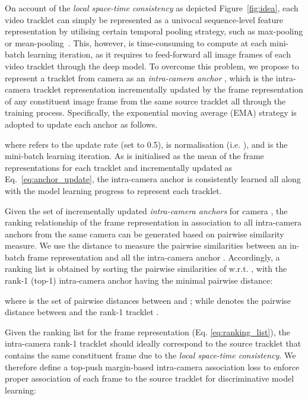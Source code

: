 \documentclass{bmvc2k}
\begin{document}
\vspace{0.1em}
On account of the {\em local space-time consistency} as depicted Figure~\ref{fig:idea}, each video tracklet can simply be represented as a univocal sequence-level feature representation by utilising certain temporal pooling strategy, such as max-pooling or mean-pooling~\cite{mclaughlin2016recurrent,zheng2016mars}. 
This, however, is time-consuming to compute at each mini-batch
learning iteration, as it requires to feed-forward all image frames of
each video tracklet through the deep model.
To overcome this problem, 
we propose to represent a tracklet from camera  as an {\em
  intra-camera anchor} , which is the intra-camera tracklet representation
 incrementally updated by the frame representation
 of any constituent image frame from the same source tracklet all through the training process. 
Specifically, the exponential moving average (EMA) strategy is adopted to update each anchor  as follows. 


where  refers to the update rate (set to 0.5),  is  normalisation (i.e. ), 
and  is the mini-batch learning iteration.
As  is initialised as the mean of the frame representations for each tracklet and incrementally updated as Eq.~\eqref{eq:anchor_update}, 
the intra-camera anchor is consistently learned all along with 
the model learning progress to represent each tracklet.
 
\vspace{0.1em}
Given the set of incrementally updated {\em intra-camera anchors}
 for camera , the ranking relationship of
the frame representation  in association to all {intra-camera anchors} from the same camera  can be
generated based on pairwise similarity measure. 
We use the  distance to measure the pairwise similarities between an in-batch frame representation  and all the {intra-camera anchor} . 
Accordingly, a ranking list is obtained by sorting the pairwise similarities of  
w.r.t. , 
with the rank-1 (top-1) {intra-camera
  anchor} having the minimal pairwise distance: 

where  is the set of pairwise distances between  and ; 
while  denotes the pairwise distance between  and the rank-1 tracklet .


\vspace{0.1em}
Given the ranking list for the frame representation  (Eq. \eqref{eq:ranking_list}), 
the intra-camera rank-1 tracklet  should 
ideally correspond to the source tracklet  that contains the same constituent frame 
due to the {\em local space-time consistency}. 
We therefore define a top-push margin-based intra-camera association loss to enforce proper association of each frame to the source tracklet for discriminative model learning: 
\end{document}
